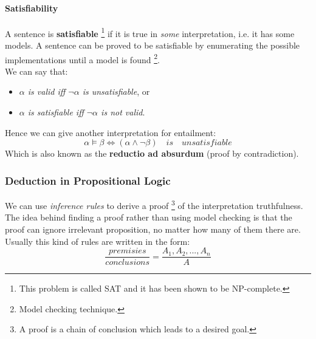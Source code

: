\documentclass[10pt,a4paper]{article}
\begin{document}
\paragraph{Satisfiability}
\label{sec:satisfiability}
A sentence is \textbf{satisfiable} \footnote{This problem is called SAT and it has been shown to be NP-complete.} if it is true in \textit{some} interpretation, i.e. it has some models. A sentence can be proved to be satisfiable by enumerating the possible implementations until a model is found \footnote{Model checking technique.}.\\
We can say that:
\begin{itemize}
\item \textit{$\alpha$ is valid iff $\neg \alpha$ is unsatisfiable}, or
\item \textit{$\alpha$ is satisfiable iff $\neg \alpha$ is not valid}.
\end{itemize}
Hence we can give another interpretation for entailment:
\[\alpha \models \beta \Longleftrightarrow (\alpha \wedge \neg \beta)\quad is \quad unsatisfiable\]
Which is also known as the \textbf{reductio ad absurdum} (proof by contradiction).

\subsubsection{Deduction in Propositional Logic}
\label{subsubsec:deduction}
We can use \textit{inference rules} to derive a proof \footnote{A proof is a chain of conclusion which leads to a desired goal.} of the interpretation truthfulness.
The idea behind finding a proof rather than using model checking is that the proof can ignore irrelevant proposition, no matter how many of them there are.\\
Usually this kind of rules are written in the form:
\[\frac{premisies}{conclusions}=\frac{A_1,A_2,...,A_n}{A}\]
\end{document}
